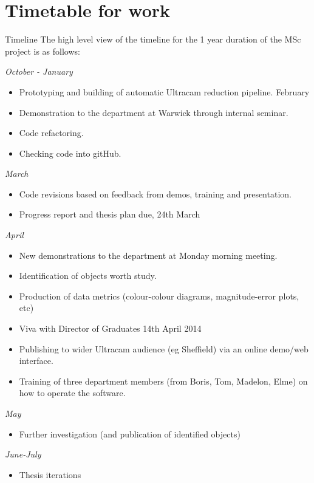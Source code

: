\documentclass[a4paper,10pt]{article}
\begin{document}
\section{Timetable for work}

Timeline 
The high level view of the timeline for the 1 year duration of the MSc project is as follows:

\emph{October - January}
\begin{itemize} 
	\item Prototyping and building of automatic Ultracam reduction pipeline.
February
	\item Demonstration to the department at Warwick through internal seminar.
	\item Code refactoring.
	\item Checking code into gitHub.
\end{itemize}

\emph{March}
\begin{itemize} 
	\item Code revisions based on feedback from demos, training and presentation.
	\item Progress report and thesis plan due, 24th March
\end{itemize}

\emph{April}
\begin{itemize} 
	\item New demonstrations to the department at Monday morning meeting.
	\item Identification of objects worth study.
	\item Production of data metrics (colour-colour diagrams, magnitude-error plots, etc)
	\item Viva with Director of Graduates 14th April 2014
	\item Publishing to wider Ultracam audience (eg Sheffield) via an online demo/web interface.
	\item Training of three department members (from Boris, Tom, Madelon, Elme) on how to operate the software.
\end{itemize}
	
	
\emph{May}
\begin{itemize} 
	\item Further investigation (and publication of identified objects)
\end{itemize}

\emph{June-July}
\begin{itemize} 
	\item Thesis iterations
\end{itemize}
	
\end{document}
